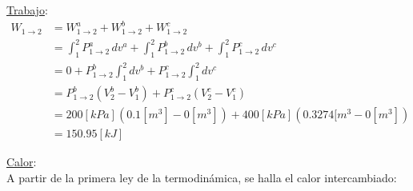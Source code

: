 \documentclass[letter,11pt]{article}
\begin{document}
\begin{enumerate}
\underline{Trabajo}: \\
\begin{equation*}
    \begin{split}
    W_{1\rightarrow 2} &= W_{1\rightarrow 2}^a + W_{1\rightarrow 2}^b
                          + W_{1\rightarrow 2}^c \\
                       &= \int_1^2 P_{1\rightarrow 2}^a\,dv^a
                          + \int_1^2 P_{1\rightarrow 2}^b\,dv^b
                          + \int_1^2 P_{1\rightarrow 2}^c\,dv^c \\
                       &= 0 + P_{1\rightarrow 2}^b \int_1^2 dv^b
                          + P_{1\rightarrow 2}^c \int_1^2 dv^c \\
                       &= P_{1\rightarrow 2}^b (V_2^b - V_1^b)
                          + P_{1\rightarrow 2}^c (V_2^c - V_1^c) \\
                       &= 200[kPa](0.1[m^3]-0[m^3])
                          + 400[kPa](0.3274[m^3-0[m^3]) \\
                       &= 150.95[kJ]
    \end{split}
\end{equation*}

\underline{Calor}: \\
A partir de la primera ley de la termodinámica, se halla el calor intercambiado:


\end{enumerate}
\end{document}
